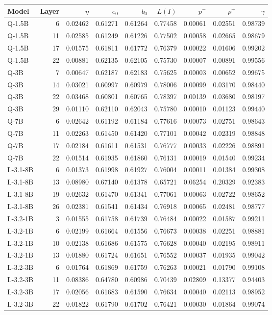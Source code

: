 \begin{tabular}{lr rrrrrrr}
\toprule
Model & Layer & $\eta$ & $e_0$ & $b_0$ & $L(I)$ & $p^-$ & $p^+$ & $\gamma$ \\
\midrule
Q-1.5B & 6 & 0.02462 & 0.61271 & 0.61264 & 0.77458 & 0.00061 & 0.02551 & 0.98739 \\
Q-1.5B & 11 & 0.02585 & 0.61249 & 0.61226 & 0.77502 & 0.00058 & 0.02665 & 0.98679 \\
Q-1.5B & 17 & 0.01575 & 0.61811 & 0.61772 & 0.76379 & 0.00022 & 0.01606 & 0.99202 \\
Q-1.5B & 22 & 0.00881 & 0.62135 & 0.62105 & 0.75730 & 0.00007 & 0.00891 & 0.99556 \\
Q-3B & 7 & 0.00647 & 0.62187 & 0.62183 & 0.75625 & 0.00003 & 0.00652 & 0.99675 \\
Q-3B & 14 & 0.03021 & 0.60997 & 0.60979 & 0.78006 & 0.00099 & 0.03170 & 0.98440 \\
Q-3B & 22 & 0.03468 & 0.60801 & 0.60765 & 0.78397 & 0.00139 & 0.03680 & 0.98197 \\
Q-3B & 29 & 0.01110 & 0.62110 & 0.62043 & 0.75780 & 0.00010 & 0.01123 & 0.99440 \\
Q-7B & 6 & 0.02642 & 0.61192 & 0.61184 & 0.77616 & 0.00073 & 0.02751 & 0.98643 \\
Q-7B & 11 & 0.02263 & 0.61450 & 0.61420 & 0.77101 & 0.00042 & 0.02319 & 0.98848 \\
Q-7B & 17 & 0.02184 & 0.61611 & 0.61531 & 0.76777 & 0.00033 & 0.02226 & 0.98891 \\
Q-7B & 22 & 0.01514 & 0.61935 & 0.61860 & 0.76131 & 0.00019 & 0.01540 & 0.99234 \\
L-3.1-8B & 6 & 0.01373 & 0.61998 & 0.61927 & 0.76004 & 0.00011 & 0.01384 & 0.99308 \\
L-3.1-8B & 13 & 0.08980 & 0.67140 & 0.61378 & 0.65721 & 0.06254 & 0.20329 & 0.92383 \\
L-3.1-8B & 19 & 0.02632 & 0.61470 & 0.61341 & 0.77061 & 0.00063 & 0.02722 & 0.98652 \\
L-3.1-8B & 26 & 0.02381 & 0.61541 & 0.61434 & 0.76918 & 0.00065 & 0.02481 & 0.98777 \\
L-3.2-1B & 3 & 0.01555 & 0.61758 & 0.61739 & 0.76484 & 0.00022 & 0.01587 & 0.99211 \\
L-3.2-1B & 6 & 0.02199 & 0.61664 & 0.61556 & 0.76673 & 0.00038 & 0.02251 & 0.98881 \\
L-3.2-1B & 10 & 0.02138 & 0.61686 & 0.61575 & 0.76628 & 0.00040 & 0.02195 & 0.98911 \\
L-3.2-1B & 13 & 0.01880 & 0.61724 & 0.61651 & 0.76552 & 0.00037 & 0.01935 & 0.99042 \\
L-3.2-3B & 6 & 0.01764 & 0.61869 & 0.61759 & 0.76263 & 0.00021 & 0.01790 & 0.99108 \\
L-3.2-3B & 11 & 0.08386 & 0.64780 & 0.60986 & 0.70439 & 0.02809 & 0.13377 & 0.94403 \\
L-3.2-3B & 17 & 0.02056 & 0.61683 & 0.61590 & 0.76634 & 0.00040 & 0.02113 & 0.98952 \\
L-3.2-3B & 22 & 0.01822 & 0.61790 & 0.61702 & 0.76421 & 0.00030 & 0.01864 & 0.99074 \\
\bottomrule
\end{tabular}
